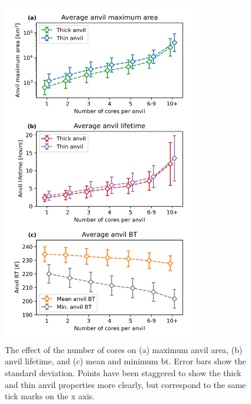\begin{figure}[tp]
    \centering
    \includegraphics[width=0.75\textwidth]{figures/chapter3_07.png}
    \caption[
    The effect of the number of cores on maximum anvil area, anvil lifetime, and mean and minimum \acrshort{bt}
    ]{
    The effect of the number of cores on (a) maximum anvil area, (b) anvil lifetime, and (c) mean and minimum \acrshort{bt}. Error bars show the standard deviation. Points have been staggered to show the thick and thin anvil properties more clearly, but correspond to the same tick marks on the x axis.
    }
    \label{fig:anvil_number_of_cores_properties}
\end{figure}

